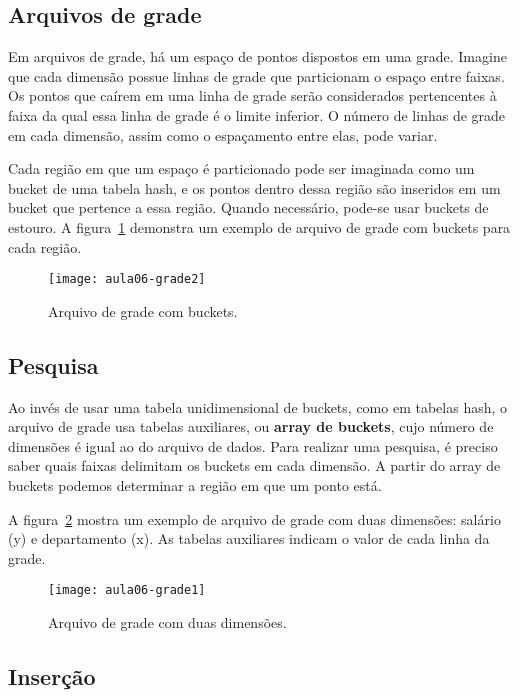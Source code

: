 \subsection{Arquivos de grade}

Em arquivos de grade, há um espaço de pontos dispostos em uma grade.
Imagine que cada dimensão possue linhas de grade 
que particionam o espaço entre faixas.
Os pontos que caírem em uma linha de grade serão considerados pertencentes
à faixa da qual essa linha de grade é o limite inferior.
O número de linhas de grade em cada dimensão, assim como o espaçamento entre elas,
pode variar.

Cada região em que um espaço é particionado pode ser imaginada como um bucket
de uma tabela hash, e os pontos dentro dessa região são inseridos em um bucket
que pertence a essa região. Quando necessário, pode-se usar buckets de estouro.
A figura~\ref{aula06:fig:grade2} demonstra um exemplo de arquivo de grade
com buckets para cada região.
%
\begin{figure}[!htb]
\centering
\texttt{[image: aula06-grade2]}
\caption{Arquivo de grade com buckets.}
\label{aula06:fig:grade2}
\end{figure}

\subsection{Pesquisa}

Ao invés de usar uma tabela unidimensional de buckets, como em tabelas hash, 
o arquivo de grade usa tabelas auxiliares, ou \textbf{array de buckets}, cujo
número de dimensões é igual ao do arquivo de dados. 
Para realizar uma pesquisa, é preciso saber quais faixas delimitam os buckets
em cada dimensão.
A partir do array de buckets podemos determinar a região em que um ponto está.

A figura~\ref{aula06:fig:grade1} mostra um exemplo de arquivo de grade
com duas dimensões: salário (y) e departamento (x). 
As tabelas auxiliares indicam o valor de cada linha da grade.
%
\begin{figure}[!htb]
\centering
\texttt{[image: aula06-grade1]}
\caption{Arquivo de grade com duas dimensões.}
\label{aula06:fig:grade1}
\end{figure}

\subsection{Inserção}

